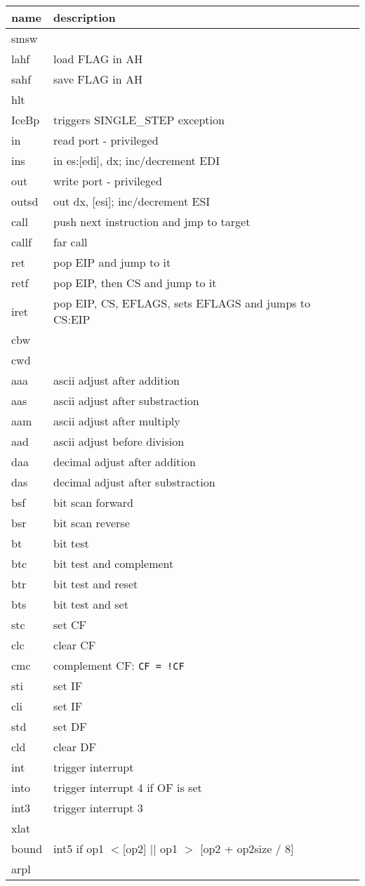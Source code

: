 \newpage
\begin{tabular}{lllll}
\toprule
name & description \\
\midrule
smsw & \\
lahf & load FLAG in AH \\ 
sahf & save FLAG in AH \\
\midrule
hlt & \\
IceBp & triggers SINGLE\_STEP exception\\
\midrule
in & read port - privileged\\
ins & in es:[edi], dx; inc/decrement EDI \\
out & write port - privileged\\
outsd & out dx, [esi]; inc/decrement ESI\\
\midrule
call & push next instruction and jmp to target\\
callf & far call \\
ret & pop EIP and jump to it\\
retf & pop EIP, then CS and jump to it\\
iret & pop EIP, CS, EFLAGS, sets EFLAGS and jumps to CS:EIP\\
\midrule
cbw & \\
cwd & \\
\midrule
aaa & ascii adjust after addition \\
aas & ascii adjust after substraction \\
aam & ascii adjust after multiply \\
aad & ascii adjust before division \\
daa & decimal adjust after addition \\
das & decimal adjust after substraction \\
\midrule
bsf & bit scan forward \\
bsr & bit scan reverse \\
bt & bit test\\
btc & bit test and complement \\
btr & bit test and reset\\
bts & bit test and set\\
\midrule
stc & set CF\\
clc & clear CF\\
cmc & complement CF: {\tt CF = !CF}\\
sti & set IF\\
cli & set IF\\
std & set DF\\
cld & clear DF\\
\midrule
int & trigger interrupt\\
into & trigger interrupt 4 if OF is set\\
int3 & trigger interrupt 3\\
\midrule
xlat & \\
bound & int5 if op1 $<$[op2] || op1 $>$ [op2 + op2size / 8]\\
arpl & \\
\bottomrule
\end{tabular}

\sig

